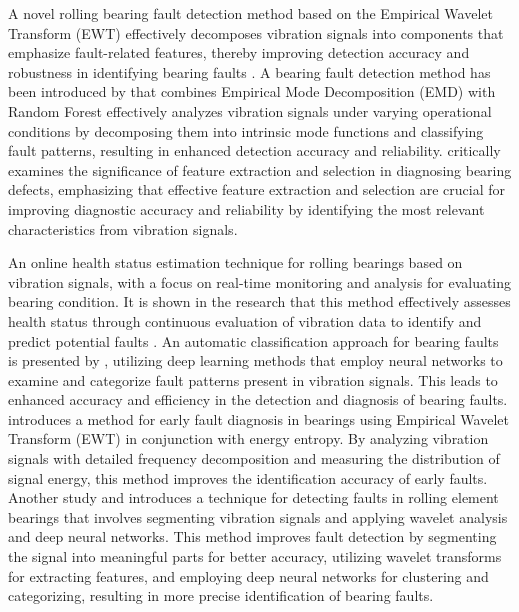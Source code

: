 \documentclass[sn-basic,pdflatex]{sn-jnl}
\theoremstyle{remark}
\theoremstyle{definition}
\begin{document}
A novel rolling bearing fault detection method based on the Empirical
Wavelet Transform (EWT) effectively decomposes vibration signals into
components that emphasize fault-related features, thereby improving
detection accuracy and robustness in identifying bearing faults
\citep{WOS:000467079500501}. A bearing fault detection method has been
introduced by \citet{WOS:000459864800144} that combines Empirical Mode
Decomposition (EMD) with Random Forest effectively analyzes vibration
signals under varying operational conditions by decomposing them into
intrinsic mode functions and classifying fault patterns, resulting in
enhanced detection accuracy and reliability. \citet{WOS:000458657500187}
critically examines the significance of feature extraction and selection
in diagnosing bearing defects, emphasizing that effective feature
extraction and selection are crucial for improving diagnostic accuracy
and reliability by identifying the most relevant characteristics from
vibration signals.

An online health status estimation technique for rolling bearings based
on vibration signals, with a focus on real-time monitoring and analysis
for evaluating bearing condition. It is shown in the research that this
method effectively assesses health status through continuous evaluation
of vibration data to identify and predict potential faults
\citep{WOS:000452922000015}. An automatic classification approach for
bearing faults is presented by \citet{WOS:000453413600001}, utilizing
deep learning methods that employ neural networks to examine and
categorize fault patterns present in vibration signals. This leads to
enhanced accuracy and efficiency in the detection and diagnosis of
bearing faults. \citet{WOS:000452819600235} introduces a method for
early fault diagnosis in bearings using Empirical Wavelet Transform
(EWT) in conjunction with energy entropy. By analyzing vibration signals
with detailed frequency decomposition and measuring the distribution of
signal energy, this method improves the identification accuracy of early
faults. Another study \citet{WOS:000450745100001} and
\citet{WOS:000449334500118} introduces a technique for detecting faults
in rolling element bearings that involves segmenting vibration signals
and applying wavelet analysis and deep neural networks. This method
improves fault detection by segmenting the signal into meaningful parts
for better accuracy, utilizing wavelet transforms for extracting
features, and employing deep neural networks for clustering and
categorizing, resulting in more precise identification of bearing
faults.
\end{document}
